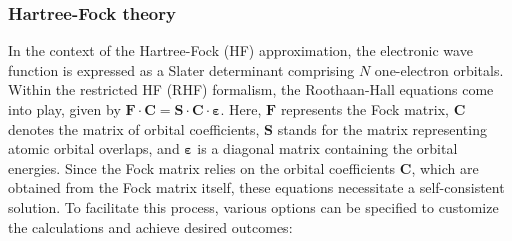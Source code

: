 \documentclass[aip,jcp,reprint,noshowkeys,superscriptaddress]{revtex4-1}
\newcommand{\FkMat}{\bm{F}}
\newcommand{\FMat}{\bm{F}}
\newcommand{\SMat}{\bm{S}}
\newcommand{\CMat}{\bm{C}}
\newcommand{\MOevMat}{\bm{\varepsilon}}
\begin{document}
\subsubsection*{Hartree-Fock theory}
In the context of the Hartree-Fock (HF) approximation, the electronic wave function is expressed as a Slater determinant comprising $N$ one-electron orbitals. \cite{SzaboBook} Within the restricted HF (RHF) formalism, the Roothaan-Hall equations come into play, given by $\FkMat \cdot \CMat = \SMat \cdot \CMat \cdot \MOevMat$. Here, $\FMat$ represents the Fock matrix, $\CMat$ denotes the matrix of orbital coefficients, $\SMat$ stands for the matrix representing atomic orbital overlaps, and $\MOevMat$ is a diagonal matrix containing the orbital energies.
Since the Fock matrix relies on the orbital coefficients $\CMat$, which are obtained from the Fock matrix itself, these equations necessitate a self-consistent solution. To facilitate this process, various options can be specified to customize the calculations and achieve desired outcomes: 
\end{document}
